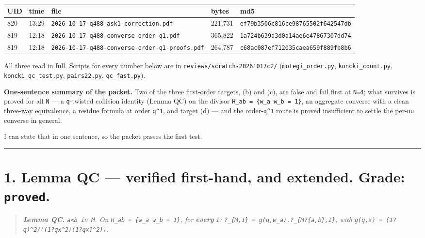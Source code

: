 \documentclass[11pt,a4paper]{article}
\begin{document}
\begin{center}\footnotesize
\begin{tabular}{@{}p{}p{}p{}p{}p{}@{}}
\hline
\textbf{UID} & \textbf{time} & \textbf{file} & \textbf{bytes} & \textbf{md5}\\ \hline
820 & 13:29 & \mbox{\texttt{2026-10-17-q488-ask1-correction.pdf}} & 221,731 & \mbox{\texttt{ef79b3506c816ce98765502f642547db}}\\
819 & 12:18 & \mbox{\texttt{2026-10-17-q488-converse-order-q1.pdf}} & 365,822 & \mbox{\texttt{1a724b639a3d0a14ae6e47867307dd74}}\\
819 & 12:18 & \mbox{\texttt{2026-10-17-q488-converse-order-q1-proofs.pdf}} & 264,787 & \mbox{\texttt{c68ac087ef712035caea659f889fb8b6}}\\
\hline\end{tabular}\end{center}

All three read in full. Scripts for every number below are in \mbox{\texttt{reviews/scratch-20261017c2/}} (\mbox{\texttt{motegi\_order.py}}, \mbox{\texttt{koncki\_count.py}}, \mbox{\texttt{koncki\_qc\_test.py}}, \mbox{\texttt{pairs22.py}}, \mbox{\texttt{qc\_fast.py}}).

\textbf{One-sentence summary of the packet.} Two of the three first-order targets, (b) and (c), are false and fail first at \mbox{\texttt{N=4}}; what survives is proved for all \mbox{\texttt{N}} --- a \mbox{\texttt{q}}-twisted collision identity (Lemma QC) on the divisor \mbox{\texttt{H\_ab = \{w\_a w\_b = 1\}}}, an aggregate converse with a clean three-way equivalence, a residue formula at order \mbox{\texttt{q\textasciicircum{}1}}, and target (d) --- and the order-\mbox{\texttt{q\textasciicircum{}1}} route is proved insufficient to settle the per-\mbox{\texttt{nu}} converse in general.

I can state that in one sentence, so the packet passes the first test.

\medskip\hrule\medskip

\section*{1. Lemma QC --- verified first-hand, and extended. Grade: \mbox{\texttt{proved}}.}

\begin{quote}\itshape \textbf{Lemma QC.} \mbox{\texttt{a<b in M}}. On \mbox{\texttt{H\_ab = \{w\_a w\_b = 1\}}}, for \textbf{every} \mbox{\texttt{I}}: \mbox{\texttt{?\_\{M,I\} = g(q,w\_a).?\_\{M?\{a,b\},I\}}}, with \mbox{\texttt{g(q,x) = (1?q)\textasciicircum{}2/((1?qx\textasciicircum{}2)(1?qx?\textasciicircum{}2))}}.\end{quote}
\end{document}
